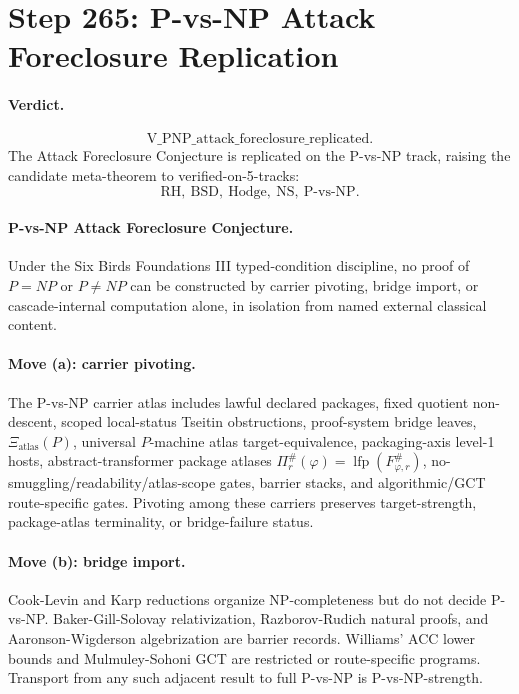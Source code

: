 \section*{Step 265: P-vs-NP Attack Foreclosure Replication}

\paragraph{Verdict.}
\[
\mathrm{V\_PNP\_attack\_foreclosure\_replicated}.
\]
The Attack Foreclosure Conjecture is replicated on the P-vs-NP track, raising
the candidate meta-theorem to verified-on-5-tracks:
\[
\mathrm{RH,\ BSD,\ Hodge,\ NS,\ P\mbox{-}vs\mbox{-}NP}.
\]

\paragraph{P-vs-NP Attack Foreclosure Conjecture.}
Under the Six Birds Foundations III typed-condition discipline, no proof of
\(P=NP\) or \(P\neq NP\) can be constructed by carrier pivoting, bridge import,
or cascade-internal computation alone, in isolation from named external
classical content.

\paragraph{Move (a): carrier pivoting.}
The P-vs-NP carrier atlas includes lawful declared packages, fixed quotient
non-descent, scoped local-status Tseitin obstructions, proof-system bridge
leaves, \(\Xi_{\mathrm{atlas}}(P)\), universal \(P\)-machine atlas
target-equivalence, packaging-axis level-1 hosts, abstract-transformer package
atlases \(\Pi_r^\#(\varphi)=\operatorname{lfp}(F_{\varphi,r}^\#)\),
no-smuggling/readability/atlas-scope gates, barrier stacks, and algorithmic/GCT
route-specific gates.  Pivoting among these carriers preserves target-strength,
package-atlas terminality, or bridge-failure status.

\paragraph{Move (b): bridge import.}
Cook-Levin and Karp reductions organize NP-completeness but do not decide
P-vs-NP.  Baker-Gill-Solovay relativization, Razborov-Rudich natural proofs,
and Aaronson-Wigderson algebrization are barrier records.  Williams' ACC lower
bounds and Mulmuley-Sohoni GCT are restricted or route-specific programs.
Transport from any such adjacent result to full P-vs-NP is P-vs-NP-strength.

